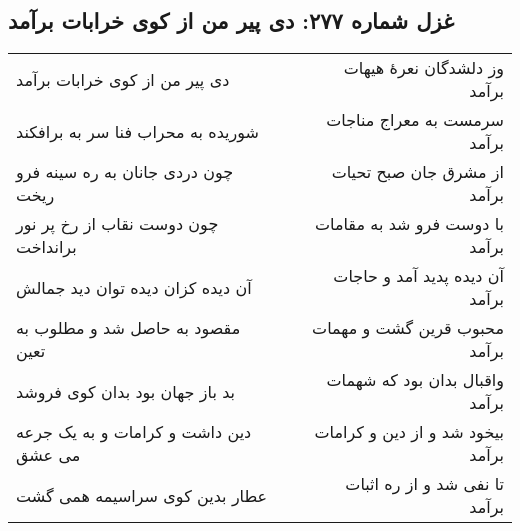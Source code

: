 \begin{center}
\section*{غزل شماره ۲۷۷: دی پیر من از کوی خرابات برآمد}
\label{sec:277}
\begin{longtable}{l p{0.5cm} r}
دی پیر من از کوی خرابات برآمد
&&
وز دلشدگان نعرهٔ هیهات برآمد
\\
شوریده به محراب فنا سر به برافکند
&&
سرمست به معراج مناجات برآمد
\\
چون دردی جانان به ره سینه فرو ریخت
&&
از مشرق جان صبح تحیات برآمد
\\
چون دوست نقاب از رخ پر نور برانداخت
&&
با دوست فرو شد به مقامات برآمد
\\
آن دیده کزان دیده توان دید جمالش
&&
آن دیده پدید آمد و حاجات برآمد
\\
مقصود به حاصل شد و مطلوب به تعین
&&
محبوب قرین گشت و مهمات برآمد
\\
بد باز جهان بود بدان کوی فروشد
&&
واقبال بدان بود که شهمات برآمد
\\
دین داشت و کرامات و به یک جرعه می عشق
&&
بیخود شد و از دین و کرامات برآمد
\\
عطار بدین کوی سراسیمه همی گشت
&&
تا نفی شد و از ره اثبات برآمد
\\
\end{longtable}
\end{center}

